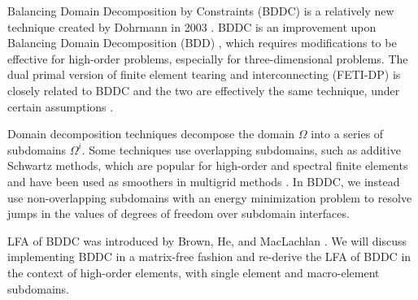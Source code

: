 Balancing Domain Decomposition by Constraints (BDDC) is a relatively new technique created by Dohrmann in 2003 \cite{dohrmann2003preconditioner}.
BDDC is an improvement upon Balancing Domain Decomposition (BDD) \cite{mandel1993balancing}, which requires modifications to be effective for high-order problems, especially for three-dimensional problems.
The dual primal version of finite element tearing and interconnecting (FETI-DP) \cite{farhat2000scalable} is closely related to BDDC and the two are effectively the same technique, under certain assumptions \cite{mandel2007bddc}.

Domain decomposition techniques decompose the domain $\Omega$ into a series of subdomains $\Omega^i$.
Some techniques use overlapping subdomains, such as additive Schwartz methods, which are popular for high-order and spectral finite elements \cite{fischer1997overlapping} and have been used as smoothers in multigrid methods \cite{fischer2005hybrid}.
In BDDC, we instead use non-overlapping subdomains with an energy minimization problem to resolve jumps in the values of degrees of freedom over subdomain interfaces.

LFA of BDDC was introduced by Brown, He, and MacLachlan \cite{brown2019local}.
We will discuss implementing BDDC in a matrix-free fashion and re-derive the LFA of BDDC in the context of high-order elements, with single element and macro-element subdomains.
